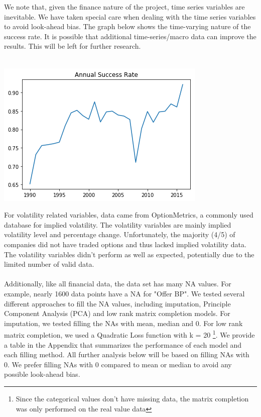 \documentclass[12pt]{article}
\begin{document}
We note that, given the finance nature of the project, time series variables are inevitable. We have taken special care when dealing with the time series variables to avoid look-ahead bias. The graph below shows the time-varying nature of the success rate. It is possible that additional time-series/macro data can improve the results. This will be left for further research.
\\
\\


\begin{center}
\includegraphics[scale=0.6]{success_rate.png}
\end{center}


For volatility related variables, data came from OptionMetrics, a commonly used database for implied volatility. The volatility variables are mainly implied volatility level and percentage change. Unfortunately, the majority (4/5) of companies did not have traded options and thus lacked implied volatility data. The volatility variables didn't perform as well as expected, potentially due to the limited number of valid data.
\\
\\

Additionally, like all financial data, the data set has many NA values. For example, nearly 1600 data points have a NA for "Offer BP". We tested several different approaches to fill the NA values, including imputation, Principle Component Analysis (PCA) and low rank matrix completion models. For imputation, we tested filling the NAs with mean, median and 0. For low rank matrix completion, we used a Quadratic Loss function with k = 20 \footnote{Since the categorical values don't have missing data, the matrix completion was only performed on the real value data}. We provide a table in the Appendix that summarizes the performance of each model and each filling method. All further analysis below will be based on filling NAs with 0. We prefer filling NAs with 0 compared to mean or median to avoid any possible look-ahead bias.
\end{document}
